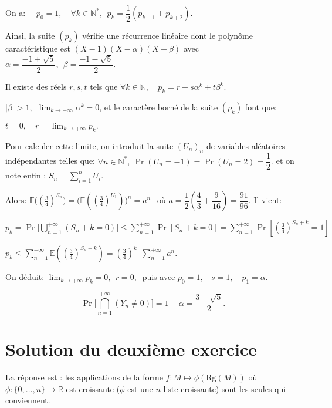   On a: $\quad p_0 =1,\quad \forall k\in \mathbb N^*, \:\: p_k = \dfrac 12 ( p_{k-1} + p_{k+2})$.
 
  Ainsi, la suite $(p_k)$ vérifie une récurrence linéaire dont le polynôme caractéristique est $(X-1)(X-\alpha)(X- \beta)$ avec $\alpha =\dfrac {-1+\sqrt5}2,\:\: \beta = \dfrac{-1-\sqrt 5}2.$
  
  Il existe des réels $r,s,t$ tels que $\forall k \in \mathbb N, \quad p_k =r+s\alpha ^k+t \beta^k.$
   
   $|\beta| >1,\:\: \displaystyle \lim _{k \to +\infty} \alpha^k =0 $, et le caractère borné de la suite $(p_k)$ font que: 
   
   $t=0,\quad \displaystyle r=\lim_{k\to + \infty} p_k.$
  
  Pour calculer cette limite, on introduit la suite $(U_n)_n$ de variables aléatoires indépendantes telles que: $\forall n \in \mathbb N^*,\: \Pr(U_n=-1) =\Pr(U_n=2) =\dfrac 12.$ et on note enfin : $S_n =\displaystyle \sum_{i=1}^n U_i.$
  
  Alors: $\mathbb E \big( (\frac 34)^{S_n} \big ) = \Big(\mathbb E \left((\frac 34)^{U_1}\right) \Big)^n = a ^n \:\:$ où $a =\dfrac12 \left(\dfrac 43 + \dfrac 9{16}\right)= \dfrac {91}{96}.$ Il vient:
  
  $p_k = \displaystyle \Pr\Big[\bigcup _{n=1}^{+\infty} (S_n+k =0)\Big]\leqslant \sum_{n=1}^{+\infty} \Pr [S_n +k =0] = \sum_{n=1}^{+\infty} \Pr \left[\left(\frac34\right ) ^{S_n+k} =1\right]$
  
  $p_k\leqslant \displaystyle \sum_{n=1}^{+\infty} \mathbb E \left(\left (\frac 34 \right)^{S_n+k}\right) = \left(\frac 34 \right)^k\:\: \sum _{n=1}^{+\infty} a^n.$ 
  
  On déduit: $\displaystyle \lim _{k\to + \infty} p_k =0,\:\: r=0,\:$ puis avec $p_0 =1, \:\:\:\: s=1, \quad p_1 = \alpha.$
  
  $$ \displaystyle \boxed {\Pr\Big[\bigcap_{n=1}^{+\infty} (Y_n \neq 0) \Big] =1-\alpha = \dfrac {3 -\sqrt 5}2}. $$
  
 
  

 
 
 

\section{Solution du deuxième exercice}
 
La réponse est : les applications de la forme $f: \displaystyle M\mapsto \phi(\mbox{Rg}(M))$ où $\displaystyle \phi : \{0,\ldots,n\}\rightarrow \mathbb{R}$ est croissante ($\phi$ est une $n$-liste croissante) sont les seules qui conviennent.

